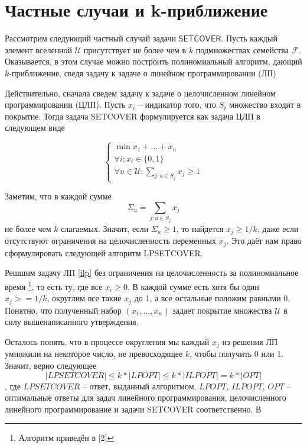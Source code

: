 \documentclass{article}
\begin{document}
\section*{Частные случаи и k-приближение}
Рассмотрим следующий частный случай задачи $\mathsf{SETCOVER}$. Пусть каждый элемент вселенной $\mathcal{U}$ присутствует не более чем в $k$ подмножествах семейства $\mathcal{F}$. Оказывается, в этом случае можно построить полиномиальный алгоритм, дающий $k$-приближение, сведя задачу к задаче о линейном программировании (ЛП)

Действительно, сначала сведем задачу к задаче о целочисленном линейном программировании (ЦЛП). Пусть $x_i$ -- индикатор того, что $S_i$ множество входит в покрытие. Тогда задача \textsf{SETCOVER} формулируется как задача ЦЛП в следующем виде

\begin{equation}
\label{ilp}
\begin{cases}
\min x_1 + \ldots + x_n \\
\forall i: x_i \in \{0, 1\} \\
\forall u \in \mathcal{U}: \displaystyle \sum_{j: u \in S_j} x_j \geq 1
\end{cases}
\end{equation}

Заметим, что в каждой сумме
$$\Sigma_u = \sum_{j: u \in S_j} x_j$$
не более чем $k$ слагаемых. Значит, если $\Sigma_u \geq 1$, то найдется $x_j \geq 1/k$, даже если отсутствуют ограничения на целочисленность переменных $x_j$. Это даёт нам право сформулировать следующей алгоритм LPSETCOVER.

Решшим задачу ЛП \ref{ilp} без ограничения на целочисленность за полиномиальное время \footnote{Алгоритм приведён в [2]}, то есть ту, где все $x_i \geq 0$. В каждой сумме есть хотя бы один $x_j >= 1/k$, округлим все такие $x_j$ до 1, а все остальные положим равными $0$. Понятно, что полученный набор $(x_1, \ldots, x_n)$ задает покрытие множества $\mathcal{U}$ в силу вышенаписанного утверждения. 

Осталось понять, что в процессе округления мы каждый $x_j$ из решения ЛП умножили на некоторое число, не превосходящее $k$, чтобы получить 0 или 1. Значит, верно следующее
$$|LPSETCOVER| \leq k * |LPOPT| \leq k * |ILPOPT| = k * |OPT|$$, где $LPSETCOVER$ -- ответ, выданный алгоритмом, $LPOPT$, $ILPOPT$, $OPT$ -- оптимальные ответы для задач линейного программирования, целочисленного линейного программирование и задачи \textsf{SETCOVER} соответственно. В
\end{document}
